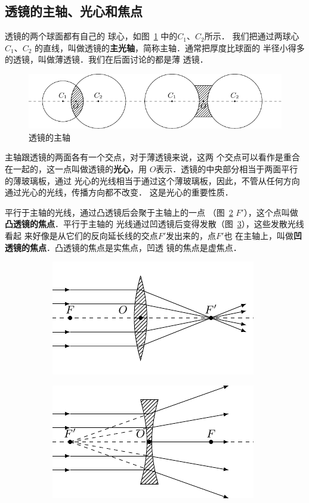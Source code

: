 \subsection{透镜的主轴、光心和焦点}

透镜的两个球面都有自己的
球心，如图~\ref{fig_C_5-35} 中的$C_1$、$C_2$所示．
我们把通过两球心$C_1$、$C_2$
的直线，叫做透镜的\textbf{主光轴}，简称主轴．通常把厚度比球面的
半径小得多的透镜，叫做薄透镜．我们在后面讨论的都是薄
透镜．
\begin{figure}[htbp]
    \centering
    \includegraphics{fig/C/5-35.pdf}
    \caption{透镜的主轴}\label{fig_C_5-35}
\end{figure}

主轴跟透镜的两面各有一个交点，对于薄透镜来说，这两
个交点可以看作是重合在一起的，这一点叫做透镜的\textbf{光心}，用
$O$表示．透镜的中央部分相当于两面平行的薄玻璃板，通过
光心的光线相当于通过这个薄玻璃板，因此，不管从任何方向
通过光心的光线，传播方向都不改变．
这是光心的重要性质．

平行于主轴的光线，通过凸透镜后会聚于主轴上的一点
（图~\ref{fig_C_5-36a} $F'$），这个点叫做\textbf{凸透镜的焦点}．平行于主轴的
光线通过凹透镜后变得发散（图~\ref{fig_C_5-36b}），这些发散光线看起
来好像是从它们的反向延长线的交点$F'$发出来的，点$F'$也
在主轴上，叫做\textbf{凹透镜的焦点}．凸透镜的焦点是实焦点，凹透
镜的焦点是虚焦点．
\begin{figure}[htbp]
    \centering
    \begin{subfigure}{0.4\linewidth}
        \centering
        \includegraphics{fig/C/5-36a.pdf}
        \caption{}\label{fig_C_5-36a}
    \end{subfigure}
    \hfil
    \begin{subfigure}{0.4\linewidth}
        \centering
        \includegraphics{fig/C/5-36b.pdf}
        \caption{}\label{fig_C_5-36b}
    \end{subfigure}
    \caption{}\label{fig_C_5-36}
\end{figure}

